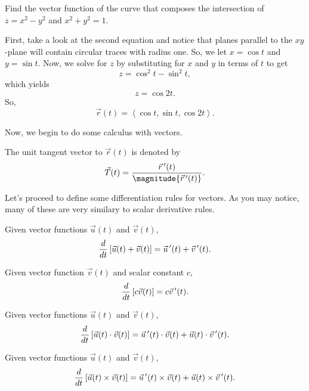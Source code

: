 \begin{example}
    Find the vector function of the curve that composes the intersection of $z = x^{2} - y^{2}$ and $x^{2} + y^{2} = 1$.

    \begin{soln}
        First, take a look at the second equation and notice that planes parallel to the $xy$-plane will contain circular traces with radius one. So, we let $x = \cos t$ and $y = \sin t$. Now, we solve for $z$ by substituting for $x$ and $y$ in terms of $t$ to get
        \[z = \cos^{2}t - \sin^{2}t,\]
        which yields
        \[z = \cos 2t.\]
        So,
        \[\vec{r}(t) = \left<\cos t, \sin t, \cos 2t\right>.\]
    \end{soln}
\end{example}

Now, we begin to do some calculus with vectors.

\begin{definition}
    The unit tangent vector to $\vec{r}(t)$ is denoted by
    \[\vec{T}(t) = \frac{\ddvec{r}(t)}{\magnitude{\ddvec{r}(t)}}.\]
\end{definition}

Let's proceed to define some differentiation rules for vectors. As you may notice, many of these are very similary to scalar derivative rules.

\begin{proposition}
    Given vector functions $\vec{u}(t)$ and $\vec{v}(t)$,
    \[\frac{d}{dt}\left[\vec{u}(t) + \vec{v}(t)\right] = \vec{u}\,^{\prime}(t) + \vec{v}\,^{\prime}(t).\]
\end{proposition}

\begin{proposition}
    Given vector function $\vec{v}(t)$ and scalar constant $c$,
    \[\frac{d}{dt}\left[c\vec{v}(t)\right] = c\vec{v}\,^{\prime}(t).\]
\end{proposition}

\begin{proposition}
    Given vector functions $\vec{u}(t)$ and $\vec{v}(t)$,
    \[\frac{d}{dt}\left[\vec{u}(t) \cdot \vec{v}(t)\right] = \vec{u}\,^{\prime}(t) \cdot \vec{v}(t) + \vec{u}(t) \cdot \vec{v}\,^{\prime}(t).\]
\end{proposition}

\begin{proposition}
    Given vector functions $\vec{u}(t)$ and $\vec{v}(t)$,
    \[\frac{d}{dt}\left[\vec{u}(t) \times \vec{v}(t)\right] = \vec{u}\,^{\prime}(t) \times \vec{v}(t) + \vec{u}(t) \times \vec{v}\,^{\prime}(t).\]
\end{proposition}

